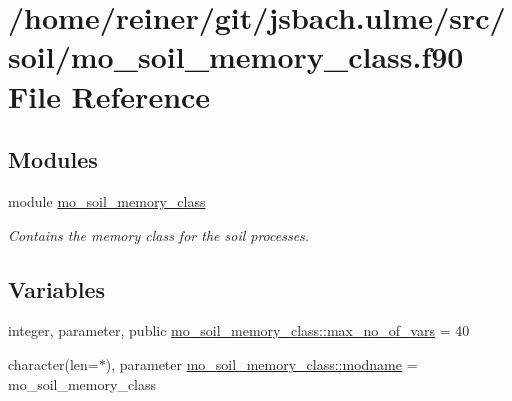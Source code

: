 \hypertarget{mo__soil__memory__class_8f90}{}\section{/home/reiner/git/jsbach.ulme/src/soil/mo\+\_\+soil\+\_\+memory\+\_\+class.f90 File Reference}
\label{mo__soil__memory__class_8f90}
\subsection*{Modules}
\begin{DoxyCompactItemize}
\item 
module \hyperlink{namespacemo__soil__memory__class}{mo\+\_\+soil\+\_\+memory\+\_\+class}
\begin{DoxyCompactList}\small\item\em Contains the memory class for the soil processes. \end{DoxyCompactList}\end{DoxyCompactItemize}
\subsection*{Variables}
\begin{DoxyCompactItemize}
\item 
integer, parameter, public \hyperlink{namespacemo__soil__memory__class_a505bdae995ec01a50f196260bcbd6f15}{mo\+\_\+soil\+\_\+memory\+\_\+class\+::max\+\_\+no\+\_\+of\+\_\+vars} = 40
\item 
character(len=$\ast$), parameter \hyperlink{namespacemo__soil__memory__class_a3cbf2b7edbe366c9e50eb360d3a1bcbd}{mo\+\_\+soil\+\_\+memory\+\_\+class\+::modname} = \textquotesingle{}mo\+\_\+soil\+\_\+memory\+\_\+class\textquotesingle{}
\end{DoxyCompactItemize}
